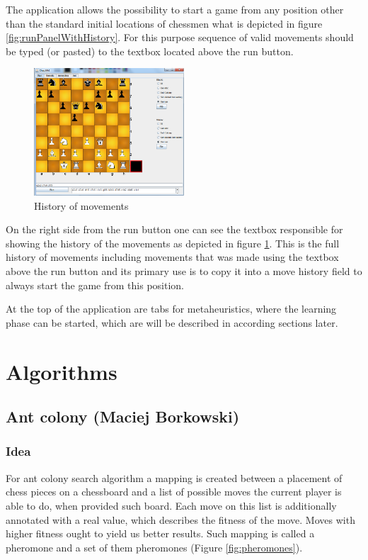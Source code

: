 \documentclass[pdftex]{article}
\begin{document}
The application allows the possibility to start a game from any position other than the standard initial locations of chessmen what is depicted in figure \ref{fig:runPanelWithHistory}. For this purpose sequence of valid movements should be typed (or pasted) to the textbox located above the run button.

\begin{figure}[!htb]
	\centering
	\includegraphics[width=0.5\textwidth]{chessImages/withHistoryAndGameHistory.png} 
	\caption{History of movements}
	\label{fig:runPanelWithMovementsHistory}
\end{figure}

On the right side from the run button one can see the textbox responsible for showing the history of the movements as depicted in figure \ref{fig:runPanelWithMovementsHistory}. This is the full history of movements including movements that was made using the textbox above the run button and its primary use is to copy it into a move history field to always start the game from this position.

At the top of the application are tabs for metaheuristics, where the learning phase can be started, which are will be described in according sections later.

\section{Algorithms}
\label{sec:project}

\subsection{Ant colony (Maciej Borkowski)}
\label{sec:ant}

\subsubsection{Idea}
For ant colony search algorithm a mapping is created between a placement of chess pieces on a chessboard and a list of possible moves the current player is able to do, when provided such board. Each move on this list is additionally annotated with a real value, which describes the fitness of the move. Moves with higher fitness ought to yield us better results. Such mapping is called a pheromone and a set of them pheromones (Figure \ref{fig:pheromones}).
\end{document}
